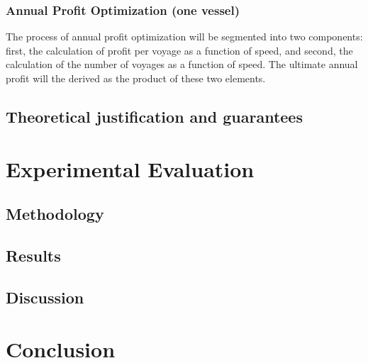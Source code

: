 \documentclass[a4paper,12pt]{article}
\begin{document}
\subsubsection*{Annual Profit Optimization (one vessel)}

The process of annual profit optimization will be segmented into two components: first, the calculation of profit per voyage as a function of speed, and second, the calculation of the number of voyages as a function of speed. The ultimate annual profit will the derived as the product of these two elements.\\

\subsection{Theoretical justification and guarantees}

\section{Experimental Evaluation}
\subsection{Methodology}

\subsection{Results}

\subsection{Discussion}


\section{Conclusion}
\end{document}
